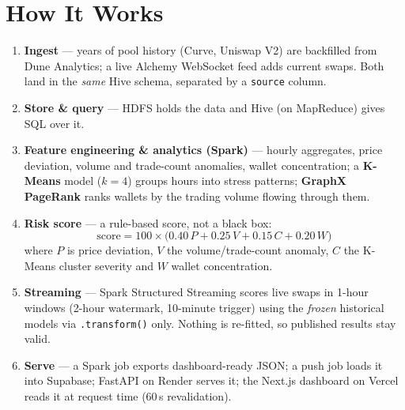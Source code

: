 \documentclass[11pt,a4paper]{article}
\let\oldsection\section
\renewcommand\section{\needspace{9\baselineskip}\oldsection}
\newcommand{\code}[1]{\texttt{\small #1}}
\begin{document}
\section*{How It Works}
\begin{enumerate}
\item \textbf{Ingest} --- years of pool history (Curve, Uniswap V2) are backfilled from Dune Analytics; a live Alchemy WebSocket feed adds current swaps. Both land in the \emph{same} Hive schema, separated by a \code{source} column.
\item \textbf{Store \& query} --- HDFS holds the data and Hive (on MapReduce) gives SQL over it.
\item \textbf{Feature engineering \& analytics (Spark)} --- hourly aggregates, price deviation, volume and trade-count anomalies, wallet concentration; a \textbf{K-Means} model ($k=4$) groups hours into stress patterns; \textbf{GraphX PageRank} ranks wallets by the trading volume flowing through them.
\item \textbf{Risk score} --- a rule-based score, not a black box:
\[
\text{score} = 100\times\bigl(0.40\,P + 0.25\,V + 0.15\,C + 0.20\,W\bigr)
\]
where $P$ is price deviation, $V$ the volume/trade-count anomaly, $C$ the K-Means cluster severity and $W$ wallet concentration.
\item \textbf{Streaming} --- Spark Structured Streaming scores live swaps in 1-hour windows (2-hour watermark, 10-minute trigger) using the \emph{frozen} historical models via \code{.transform()} only. Nothing is re-fitted, so published results stay valid.
\item \textbf{Serve} --- a Spark job exports dashboard-ready JSON; a push job loads it into Supabase; FastAPI on Render serves it; the Next.js dashboard on Vercel reads it at request time (60\,s revalidation).
\end{enumerate}
\end{document}
